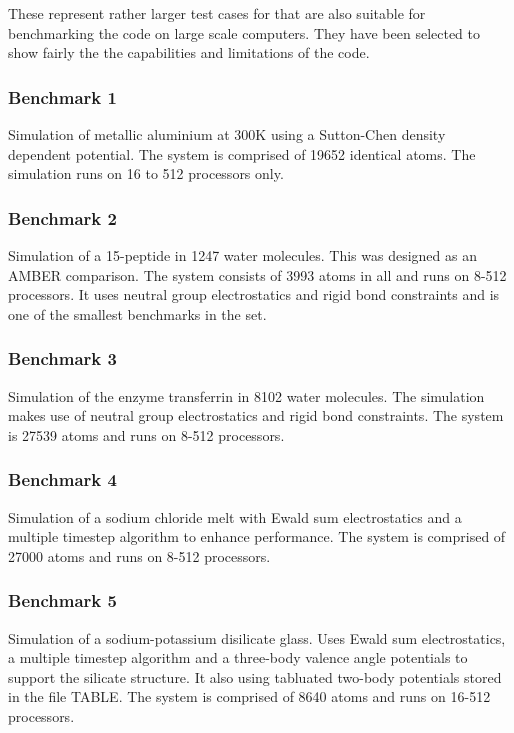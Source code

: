These represent rather larger test cases for \D{} that are also suitable
for benchmarking the code on large scale computers. They have been
selected to show fairly the the capabilities and limitations of the
code.

\subsubsection{Benchmark 1}

Simulation of metallic aluminium at 300K using a Sutton-Chen density
dependent potential. The system is comprised of 19652 identical atoms.
The simulation runs on 16 to 512 processors only. 

\subsubsection{Benchmark 2}

Simulation of a 15-peptide in 1247 water molecules. This was designed
as an AMBER comparison. The system consists of 3993 atoms in all and
runs on 8-512 processors. It uses neutral group electrostatics and
rigid bond constraints and is one of the smallest benchmarks in the
set.

\subsubsection{Benchmark 3}

Simulation of the enzyme transferrin in 8102 water molecules. The
simulation makes use of neutral group electrostatics and rigid bond
constraints.  The system is 27539 atoms and runs on 8-512 processors.

\subsubsection{Benchmark 4}

Simulation of a sodium chloride melt with Ewald sum electrostatics and
a multiple timestep algorithm to enhance performance. The system is
comprised of 27000 atoms and runs on 8-512 processors.

\subsubsection{Benchmark 5}

Simulation of a sodium-potassium disilicate glass. Uses Ewald sum
electrostatics, a multiple timestep algorithm and a three-body valence
angle potentials to support the silicate structure. It also using
tabluated two-body potentials stored in the file TABLE. The system is
comprised of 8640 atoms and runs on 16-512 processors.

